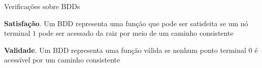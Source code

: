 \expandafter\documentclass\expandafter[table, usenames, svgnames, dvipsnames,14pt, \classopts]{beamer}
\begin{document}
\begin{frame}{Verificações sobre \uppercase{BDD}s}

    \begin{outline}
        \1 \textbf{Satisfação}. Um BDD representa uma função que pode ser satisfeita se um nó terminal $1$ pode ser acessado da raiz por meio de um caminho consistente
        
        \vspace{1em}
        
        \1 \textbf{Validade}. Um BDD representa uma função válida se nenhum ponto terminal $0$ é acessível por um caminho consistente
    \end{outline}

    \begin{center}
    \end{center}
    
\end{frame}
\end{document}
